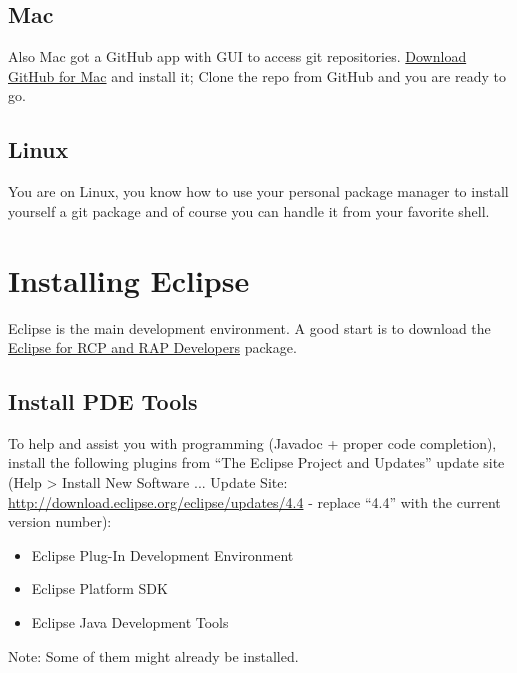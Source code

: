 \subsection{Mac}
\label{development/setup:download-github-for-windows}\label{development/setup:mac}
Also Mac got a GitHub app with GUI to access git repositories. \href{https://mac.github.com/}{Download GitHub for Mac} and install it; Clone the repo from GitHub and you are ready to go.


\subsection{Linux}
\label{development/setup:download-github-for-mac}\label{development/setup:linux}
You are on Linux, you know how to use your personal package manager to install yourself a git package and of course you can handle it from your favorite shell.


\section{Installing Eclipse}
\label{development/setup:installing-eclipse}
Eclipse is the main development environment. A good start is to download the \href{https://www.eclipse.org/downloads/}{Eclipse for RCP and RAP Developers} package.


\subsection{Install PDE Tools}
\label{development/setup:install-pde-tools}\label{development/setup:eclipse-for-rcp-and-rap-developers}
To help and assist you with programming (Javadoc + proper code completion), install the following plugins from ``The Eclipse Project and Updates'' update site (Help \textgreater{} Install New Software ... Update Site: \href{http://download.eclipse.org/eclipse/updates/4.4}{http://download.eclipse.org/eclipse/updates/4.4} - replace ``4.4'' with the current version number):
\begin{itemize}
\item {} 
Eclipse Plug-In Development Environment

\item {} 
Eclipse Platform SDK

\item {} 
Eclipse Java Development Tools

\end{itemize}

Note: Some of them might already be installed.


